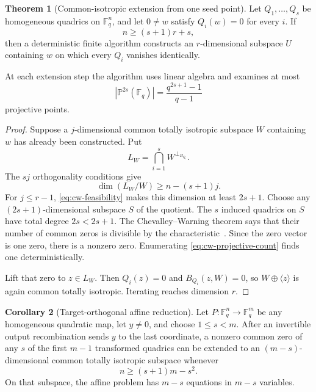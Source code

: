 \documentclass[11pt,a4paper]{article}
\theoremstyle{definition}
\newtheorem{theorem}{Theorem}[section]
\newtheorem{corollary}[theorem]{Corollary}
\theoremstyle{remark}
\newcommand{\F}{\mathbb F}
\newcommand{\PP}{\mathbb P}
\begin{document}
\begin{theorem}[Common-isotropic extension from one seed point]\label{thm:cw-extension}
Let $Q_1,\ldots,Q_s$ be homogeneous quadrics on $\F_q^n$, and let $0\ne w$ satisfy $Q_i(w)=0$ for every $i$.  If
\begin{equation}\label{eq:cw-feasibility}
 n\ge(s+1)r+s,
\end{equation}
then a deterministic finite algorithm constructs an $r$-dimensional subspace $U$ containing $w$ on which every $Q_i$ vanishes identically.

At each extension step the algorithm uses linear algebra and examines at most
\begin{equation}\label{eq:cw-projective-count}
 \left|\PP^{2s}(\F_q)\right|
 =\frac{q^{2s+1}-1}{q-1}
\end{equation}
projective points.
\end{theorem}

\begin{proof}
Suppose a $j$-dimensional common totally isotropic subspace $W$ containing $w$ has already been constructed.  Put
\[
 L_W=\bigcap_{i=1}^s W^{\perp_{B_{Q_i}}}.
\]
The $sj$ orthogonality conditions give
\[
 \dim(L_W/W)\ge n-(s+1)j.
\]
For $j\le r-1$, \eqref{eq:cw-feasibility} makes this dimension at least $2s+1$.  Choose any $(2s+1)$-dimensional subspace $S$ of the quotient.  The $s$ induced quadrics on $S$ have total degree $2s<2s+1$.  The Chevalley--Warning theorem says that their number of common zeros is divisible by the characteristic~\cite{Chevalley1935,Warning1935}.  Since the zero vector is one zero, there is a nonzero zero.  Enumerating \eqref{eq:cw-projective-count} finds one deterministically.

Lift that zero to $z\in L_W$.  Then $Q_i(z)=0$ and $B_{Q_i}(z,W)=0$, so $W\oplus\langle z\rangle$ is again common totally isotropic.  Iterating reaches dimension $r$.
\end{proof}

\begin{corollary}[Target-orthogonal affine reduction]\label{cor:generic-target-slicing}
Let $P:\F_q^n\to\F_q^m$ be any homogeneous quadratic map, let $y\ne0$, and
choose $1\le s<m$.  After an invertible output recombination sends $y$ to the
last coordinate, a nonzero common zero of any $s$ of the first $m-1$
transformed quadrics can be extended to an $(m-s)$-dimensional common totally
isotropic subspace whenever
\begin{equation}\label{eq:generic-square-condition}
 n\ge(s+1)m-s^2.
\end{equation}
On that subspace, the affine problem has $m-s$ equations in $m-s$ variables.
\end{corollary}
\end{document}
